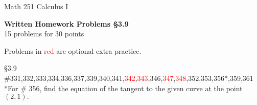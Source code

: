 \documentclass[11pt]{report}
\theoremstyle{plain}
\begin{document}
\hfill Math 251 Calculus I
\begin{center}
\Large{\textbf{Written Homework Problems \S 3.9}} \\
15 problems for 30 points\\
\end{center}

Problems in \textcolor{red}{red} are optional extra practice.

\begin{description}
\item{\S 3.9} \#331,332,333,334,336,337,339,340,341,\textcolor{red}{342},\textcolor{red}{343},346,\textcolor{red}{347},\textcolor{red}{348},352,353,356*,359,361\\

*For \# 356, find the equation of the tangent to the given curve at the point $(2,1).$


\end{description}
\end{document}
